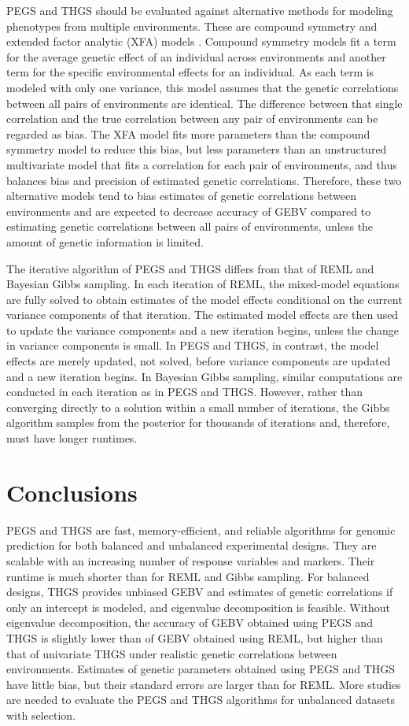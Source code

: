 \documentclass{bmcart}
\begin{document}
PEGS and THGS should be evaluated against alternative methods for modeling phenotypes from multiple environments. These are compound symmetry and extended factor analytic (XFA) models \cite{MeyerXFA}. Compound symmetry models fit a term for the average genetic effect of an individual across environments and another term for the specific environmental effects for an individual. As each term is modeled with only one variance, this model assumes that the genetic correlations between all pairs of environments are identical. The difference between that single correlation and the true correlation between any pair of environments can be regarded as bias. The XFA model fits more parameters than the compound symmetry model to reduce this bias, but less parameters than an unstructured multivariate model that fits a correlation for each pair of environments, and thus balances bias and precision of estimated genetic correlations. Therefore, these two alternative models tend to bias estimates of genetic correlations between environments and are expected to decrease accuracy of GEBV compared to estimating genetic correlations between all pairs of environments, unless the amount of genetic information is limited.

The iterative algorithm of PEGS and THGS differs from that of REML and Bayesian Gibbs sampling. In each iteration of REML, the mixed-model equations are fully solved to obtain estimates of the model effects conditional on the current variance components of that iteration. The estimated model effects are then used to update the variance components and a new iteration begins, unless the change in variance components is small. In PEGS and THGS, in contrast, the model effects are merely updated, not solved, before variance components are updated and a new iteration begins. In Bayesian Gibbs sampling, similar computations are conducted in each iteration as in PEGS and THGS. However, rather than converging directly to a solution within a small number of iterations, the Gibbs algorithm samples from the posterior for thousands of iterations and, therefore, must have longer runtimes. 

\section{Conclusions}

PEGS and THGS are fast, memory-efficient, and reliable algorithms for genomic prediction for both balanced and unbalanced experimental designs. They are scalable with an increasing number of response variables and markers. Their runtime is much shorter than for REML and Gibbs sampling. For balanced designs, THGS provides unbiased GEBV and estimates of genetic correlations if only an intercept is modeled, and eigenvalue decomposition is feasible. Without eigenvalue decomposition, the accuracy of GEBV obtained using PEGS and THGS is slightly lower than of GEBV obtained using REML, but higher than that of univariate THGS under realistic genetic correlations between environments. Estimates of genetic parameters obtained using PEGS and THGS have little bias, but their standard errors are larger than for REML. More studies are needed to evaluate the PEGS and THGS algorithms for unbalanced datasets with selection. 
\end{document}

